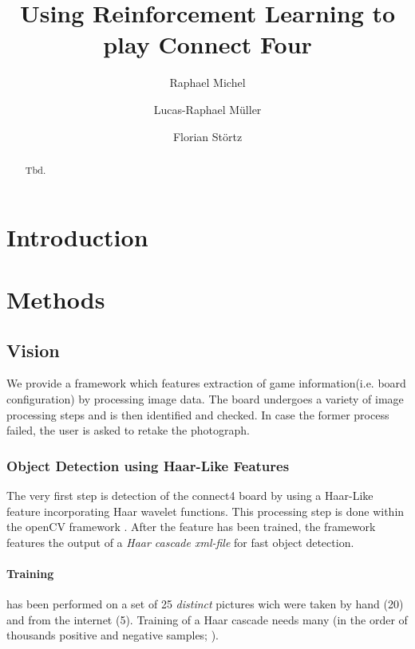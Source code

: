 \documentclass[10pt,twocolumn,letterpaper]{article}
\begin{document}
\title{Using Reinforcement Learning to play Connect Four}

\author{Raphael Michel
\and
Lucas-Raphael Müller
\and
Florian Störtz
}

\maketitle

\begin{abstract}
   Tbd.
\end{abstract}

\section{Introduction}

\section{Methods}

\subsection{Vision}
We provide a framework which features extraction of game information(i.e. board configuration) by processing image data.
The board undergoes a variety of image processing steps and is then identified and checked.
In case the former process failed, the user is asked to retake the photograph.

\subsubsection{Object Detection using Haar-Like Features}
The very first step is detection of the connect4 board by using a Haar-Like feature incorporating Haar wavelet functions.
This processing step is done within the openCV framework \parencite{openCV}.
After the feature has been trained, the framework features the output of a \textit{Haar cascade xml-file} for fast object detection.

\paragraph{Training} has been performed on a set of 25 \textit{distinct} pictures wich were taken by hand (20) and from the internet (5).
Training of a Haar cascade needs many (in the order of thousands positive and negative samples;  \cite{kuranov}).
\end{document}
